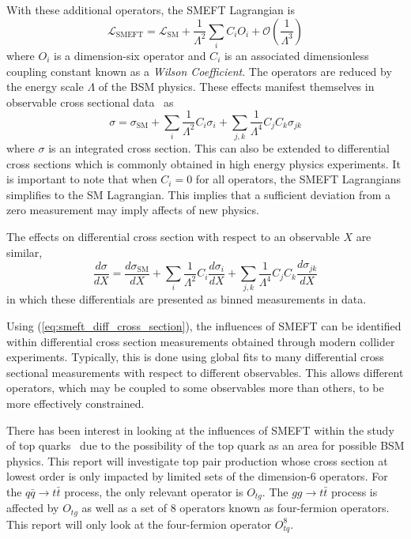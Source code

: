 \documentclass[a4paper]{article}
\begin{document}
With these additional operators, the SMEFT Lagrangian is
\begin{equation}\label{eq:smeft_lagrangian}
    \mathcal{L}_{\text{SMEFT}} = \mathcal{L}_{\text{SM}} + \frac{1}{\Lambda^2} \sum\limits_{i} C_{i} O_{i} + \mathcal{O}\left(\frac{1}{\Lambda^3}\right)
\end{equation}
where $O_{i}$ is a dimension-six operator and $C_{i}$ is an associated dimensionless coupling constant known as a \emph{Wilson Coefficient}.
The operators are reduced by the energy scale $\Lambda$ of the BSM physics.
These effects manifest themselves in observable cross sectional data~\cite{Hartland_2019} as
\begin{equation}\label{eq:smeft_cross_section}
    \sigma = \sigma_{\text{SM}} + \sum\limits_{i} \frac{1}{\Lambda^2} C_{i} \sigma_{i} + \sum\limits_{j,k} \frac{1}{\Lambda^4} C_{j} C_{k} \sigma_{j k}
\end{equation}
where $\sigma$ is an integrated cross section. This can also be extended to differential cross sections which is commonly obtained in high energy physics experiments.
It is important to note that when $C_{i}=0$ for all operators, the SMEFT Lagrangians simplifies to the SM Lagrangian.
This implies that a sufficient deviation from a zero measurement may imply affects of new physics.

The effects on differential cross section with respect to an observable $X$ are similar,
\begin{equation}\label{eq:smeft_diff_cross_section}
    \frac{d\sigma}{dX} = \frac{d\sigma_{\text{SM}}}{dX} + \sum\limits_{i} \frac{1}{\Lambda^2} C_{i} \frac{d\sigma_{i}}{dX} + \sum\limits_{j,k} \frac{1}{\Lambda^4} C_{j} C_{k} \frac{d\sigma_{j k}}{dX}
\end{equation}
in which these differentials are presented as binned measurements in data.

Using (\ref{eq:smeft_diff_cross_section}), the influences of SMEFT can be identified within differential cross section measurements obtained through modern collider experiments.
Typically, this is done using global fits to many differential cross sectional measurements with respect to different observables.
This allows different operators, which may be coupled to some observables more than others, to be more effectively constrained.

There has been interest in looking at the influences of SMEFT within the study of top quarks~\cite{Hartland_2019,Buckley_2015,Brivio_2020} due to the possibility of the top quark as an area for possible BSM physics.
This report will investigate top pair production whose cross section at lowest order is only impacted by limited sets of the dimension-6 operators. For the $q\bar{q} \rightarrow t\bar{t}$ process, the only relevant operator is $O_{tg}$.
The $gg \rightarrow t\bar{t}$ process is affected by $O_{tg}$ as well as a set of 8 operators known as four-fermion operators.
This report will only look at the four-fermion operator $O_{tq}^{8}$.
\end{document}
